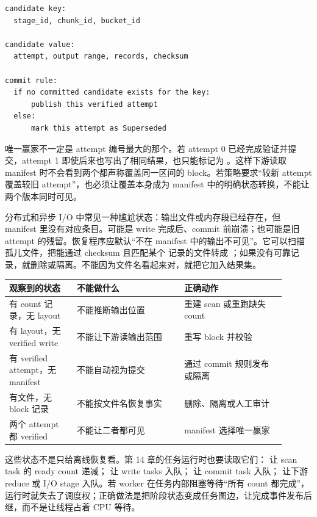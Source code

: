\begin{lstlisting}[numbers=none,caption={manifest 选择唯一赢家}]
candidate key:
  stage_id, chunk_id, bucket_id

candidate value:
  attempt, output range, records, checksum

commit rule:
  if no committed candidate exists for the key:
      publish this verified attempt
  else:
      mark this attempt as Superseded
\end{lstlisting}

唯一赢家不一定是 attempt 编号最大的那个。若 attempt 0 已经完成验证并提交，attempt 1 即使后来也写出了相同结果，也只能标记为 。这样下游读取 manifest 时不会看到两个都声称覆盖同一区间的 block。若策略要求“较新 attempt 覆盖较旧 attempt”，也必须让覆盖本身成为 manifest 中的明确状态转换，不能让两个版本同时可见。

分布式和异步 I/O 中常见一种尴尬状态：输出文件或内存段已经存在，但 manifest 里没有对应条目。可能是 write 完成后、commit 前崩溃；也可能是旧 attempt 的残留。恢复程序应默认“不在 manifest 中的输出不可见”。它可以扫描孤儿文件，把能通过 checksum 且匹配某个  记录的文件转成 ；如果没有可靠记录，就删除或隔离。不能因为文件名看起来对，就把它加入结果集。

\begin{center}
\small
\begin{tabular}{@{}p{0.22\linewidth}p{0.35\linewidth}p{0.33\linewidth}@{}}
\toprule
观察到的状态 & 不能做什么 & 正确动作 \\
\midrule
有 count 记录，无 layout & 不能推断输出位置 & 重建 scan 或重跑缺失 count \\
有 layout，无 verified write & 不能让下游读输出范围 & 重写 block 并校验 \\
有 verified attempt，无 manifest & 不能自动视为提交 & 通过 commit 规则发布或隔离 \\
有文件，无 block 记录 & 不能按文件名恢复事实 & 删除、隔离或人工审计 \\
两个 attempt 都 verified & 不能让二者都可见 & manifest 选择唯一赢家 \\
\bottomrule
\end{tabular}
\end{center}

这些状态不是只给离线恢复看。第 14 章的任务运行时也要读取它们： 让 scan task 的 ready count 递减； 让 write tasks 入队； 让 commit task 入队； 让下游 reduce 或 I/O stage 入队。若 worker 在任务内部阻塞等待“所有 count 都完成”，运行时就失去了调度权；正确做法是把阶段状态变成任务图边，让完成事件发布后继，而不是让线程占着 CPU 等待。

